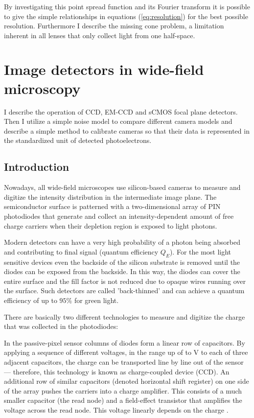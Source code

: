 By investigating this point spread function and its Fourier transform
it is possible to give the simple relationships in equations
(\ref{eq:resolution}) for the best possible resolution. Furthermore I
describe the missing cone problem, a limitation inherent in all lenses
that only collect light from one half-space.



\section{Image detectors in wide-field microscopy}
\label{sec:ccd-intro}
\begin{summary}
  I describe the operation of CCD, EM-CCD and sCMOS focal plane
  detectors. Then I utilize a simple noise model to compare different
  camera models and describe a simple method to calibrate cameras so
  that their data is represented in the standardized unit of detected
  photoelectrons.
\end{summary}

\subsection{Introduction}
Nowadays, all wide-field microscopes use silicon-based cameras to
measure  and digitize the intensity distribution in the
intermediate image plane. The semiconductor surface is patterned with
a two-dimensional array of PIN photodiodes that generate and collect
an intensity-dependent amount of free charge carriers when their
depletion region is exposed to light photons.

Modern detectors can have a very high probability of a photon being
 absorbed and contributing to final signal
(quantum efficiency $Q_E$). For the most light sensitive devices even
the backside of the silicon substrate is removed until the diodes can
be exposed from the backside. In this way, the diodes can cover the
entire surface and the fill factor is not reduced due to opaque wires
running over the surface. Such detectors are called 'back-thinned' and
can achieve a quantum efficiency of up to $95\%$ for green light.

There are basically two different technologies to measure and digitize
the charge that was collected in the photodiodes:

In the passive-pixel sensor columns of diodes form a linear row of
 capacitors. By applying a sequence
of different voltages, in the range up of to \unit[6]{V} to each of
three adjacent capacitors, the charge can be transported line by line
out of the sensor --- therefore, this technology is known as
charge-coupled device (CCD). An additional row of similar capacitors
(denoted horizontal shift register) on one side of the array pushes
the carriers into a charge amplifier.  This
consists of a much smaller capacitor (the read node) and a
field-effect transistor that amplifies the voltage across the read
node. This voltage linearly depends on the charge \citep{Pawley2006}.

